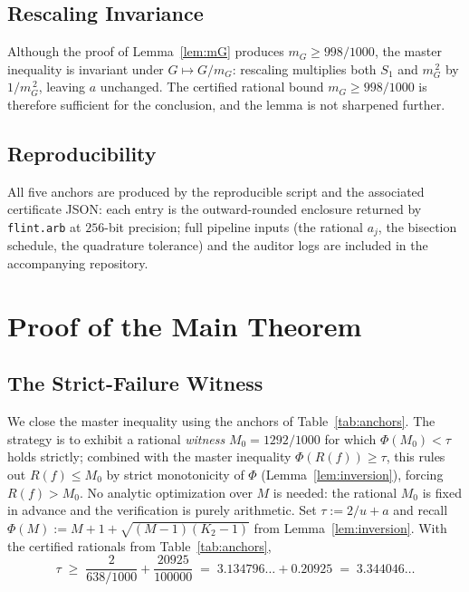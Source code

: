 \documentclass[11pt, letterpaper]{article}
\theoremstyle{paperplain}
\theoremstyle{paperdef}
\begin{document}
\subsection{Rescaling Invariance}\label{subsec:cert-rescaling}

Although the proof of Lemma~\ref{lem:mG}
produces $m_G\ge 998/1000$, the master inequality is invariant
under $G\mapsto G/m_G$: rescaling multiplies both $S_1$ and $m_G^{\,2}$
by $1/m_G^{\,2}$, leaving $a$ unchanged.  The certified rational
bound $m_G\ge 998/1000$ is therefore sufficient for the conclusion,
and the lemma is not sharpened further.

\subsection{Reproducibility}\label{subsec:cert-repro}

All five anchors are produced by the reproducible script and the
associated certificate JSON: each entry is the outward-rounded enclosure
returned by \texttt{flint.arb} at $256$-bit precision; full pipeline
inputs (the rational $a_j$, the bisection schedule, the
quadrature tolerance) and the auditor logs are included in the
accompanying repository.

\section{Proof of the Main Theorem}\label{sec:proof}

\subsection{The Strict-Failure Witness}\label{subsec:proof-witness}

We close the master inequality using the anchors of
Table~\ref{tab:anchors}.  The strategy is to exhibit a rational
\emph{witness} $M_0=1292/1000$ for which $\Phi(M_0)<\tau$ holds
strictly; combined with the master inequality $\Phi(R(f))\ge\tau$,
this rules out $R(f)\le M_0$ by strict monotonicity of $\Phi$
(Lemma~\ref{lem:inversion}), forcing $R(f)>M_0$.  No analytic
optimization over $M$ is needed: the rational $M_0$ is fixed in
advance and the verification is purely arithmetic.
Set $\tau:=2/u+a$ and recall
$\Phi(M):=M+1+\sqrt{(M-1)(K_2-1)}$ from Lemma~\ref{lem:inversion}.
With the certified rationals from Table~\ref{tab:anchors},
\[
  \tau
  \;\ge\; \frac{2}{638/1000} + \frac{20925}{100000}
  \;=\; 3.134796\ldots + 0.20925
  \;=\; 3.344046\ldots
\]
\end{document}
